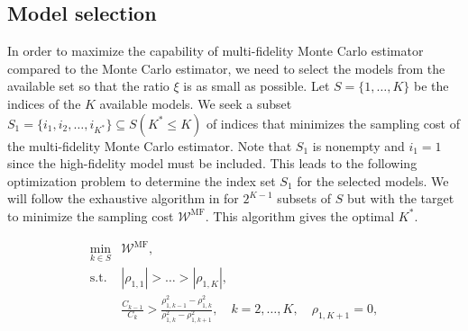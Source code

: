 \subsection{Model selection}
In order to maximize the capability of multi-fidelity Monte Carlo estimator  compared to the Monte Carlo estimator, we need to select the models from the available set so that the ratio $\xi$ is as small as possible. Let $S=\{1, \ldots, K\}$ be the indices of the $K$ available models. We seek a subset $S_1=\{i_1,i_2, \ldots,i_{K^*}\}\subseteq S (K^*\le K)$ of indices that minimizes the sampling cost of the multi-fidelity Monte Carlo estimator. Note that $S_1$ is nonempty and $i_1=1$ since the high-fidelity model must be included. This leads to the following optimization problem to determine the index set $S_1$ for the selected models. We will follow the exhaustive algorithm in \cite[Algorithm~1]{PeWiGu:2016} for $2^{K-1}$ subsets of $S$ but with the target to minimize the sampling cost $\mathcal{W}^\text{MF}$. This algorithm gives the optimal $K^*$.

\begin{equation*}\label{eq:Optimization_pb_model_selection}
    \begin{array}{lll}
    \displaystyle\min_{k\in S} &\displaystyle \mathcal{W}^\text{MF},\\
       \text{s.t.} &\displaystyle |\rho_{1,1}|>\ldots>|\rho_{1,K}|,\\
       &\displaystyle \frac{C_{k-1}}{C_k}>\frac{\rho_{1,k-1}^2-\rho_{1,k}^2}{\rho_{1,k}^2-\rho_{1,k+1}^2}, \quad k=2,\ldots,K, \quad \rho_{1,K+1}=0,\\
    \end{array}
\end{equation*}


